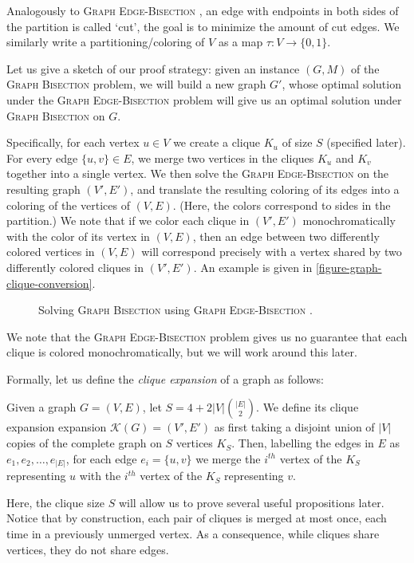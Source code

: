 \documentclass{article}
\newcommand{\gb}{\textsc{Graph \allowbreak Bisection} }
\newcommand{\geb}{\textsc{Graph \allowbreak Edge-\allowbreak Bisection} }
\begin{document}
	Analogously to \geb, an edge with endpoints in both sides of the
	partition is called `cut', the goal is to minimize the amount of
	cut edges. We similarly write a partitioning/coloring of $V$ as
	a map $\tau : V \to \{0, 1\}$.

	Let us give a sketch of our proof strategy:
	given an instance $(G, M)$ of the \gb problem, we
	will build a new graph $G'$, whose optimal solution under the 
	\geb problem will give us an optimal solution under \gb on $G$.

	Specifically, for each vertex $u \in V$ we create a clique $K_u$ of size
	$S$ (specified later). For every edge $\{u, v\} \in E$, we merge
	two vertices in the cliques $K_u$ and $K_v$ together into a single
	vertex. We then solve the \geb on the resulting graph $(V', E')$, and
	translate the resulting coloring of its edges into a coloring of the
	vertices of $(V, E)$. (Here, the colors correspond to sides in the
	partition.) We note that if we color each clique in $(V', E')$
	monochromatically with the color of its vertex in $(V, E)$, then
	an edge between two differently colored vertices in $(V, E)$ will
	correspond precisely with a vertex shared by two differently colored
	cliques in $(V', E')$.
	An example is given in \autoref{figure-graph-clique-conversion}.

	\begin{figure}[h]
		
		\centering
		\caption{Solving \gb using \geb.}
		\label{figure-graph-clique-conversion}
	\end{figure}

	We note that
	the \geb problem gives us no guarantee that each clique is colored
	monochromatically, but we will work around this later.

	Formally, let us define the \textit{clique expansion} of a graph as
	follows:

	\begin{definition}
		\label{clique-expansion}
		Given a graph $G = (V, E)$,
		let $S = 4 + 2|V|\binom{|E|}{2}$.
		We define its clique expansion expansion
		$\mathcal{K}(G) = (V', E')$ as first taking a disjoint union of $|V|$
		copies of the complete graph on $S$ vertices $K_S$. Then, labelling the
		edges in $E$ as $e_1, e_2, \dots, e_{|E|}$, for each edge
		$e_i = \{u, v\}$
		we merge the $i^{th}$ vertex of the $K_S$ representing $u$ with the
		$i^{th}$ vertex of the $K_S$ representing $v$.
	\end{definition}

	Here, the clique size $S$ will allow us to prove several
	useful propositions later. Notice that by construction, each pair of
	cliques is merged at most once, each time in a previously unmerged vertex.
	As a consequence, while cliques share vertices, they do not share edges.
\end{document}
